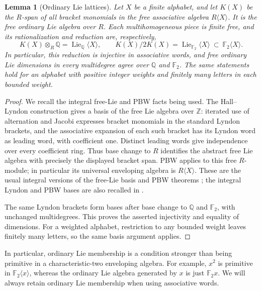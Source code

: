 \documentclass[11pt]{article}
\newcommand{\Q}{\mathbb Q}
\newcommand{\Z}{\mathbb Z}
\newcommand{\F}{{\mathbb F_2}}
\newcommand{\Lie}{\operatorname{Lie}}
\newtheorem{lemma}[theorem]{Lemma}
\theoremstyle{definition}
\theoremstyle{remark}
\numberwithin{equation}{section}
\begin{document}
\begin{samepage}
\begin{lemma}[Ordinary Lie lattices]\label{lem:lie-lattice}
Let \(X\) be a finite alphabet, and let \(K(X)\) be the \(R\)-span of
all bracket monomials in the free associative algebra
\(R\langle X\rangle\).  It is the free ordinary Lie algebra over \(R\).
Each multihomogeneous piece is finite free, and its rationalization and
reduction are, respectively,
\[
 K(X)\otimes_R\Q=\Lie_{\Q}\langle X\rangle,
 \qquad
 K(X)/2K(X)=\Lie_{\F}\langle X\rangle
       \ \subset\ \F\langle X\rangle.
\]
In particular, this reduction is injective in associative words, and
free ordinary Lie dimensions in every multidegree agree over \(\Q\)
and \(\F\).  The same statements hold for an alphabet with positive
integer weights and finitely many letters in each bounded weight.
\end{lemma}
\end{samepage}
\begin{proof}
We recall the integral free-Lie and PBW facts being used.  The
Hall--Lyndon construction gives a basis of the free Lie algebra over
\(\Z\): iterated use of alternation and Jacobi expresses bracket
monomials in the standard Lyndon brackets, and the associative
expansion of each such bracket has its Lyndon word as leading word,
with coefficient one.  Distinct leading words give independence over
every coefficient ring.  Thus base change to \(R\) identifies the
abstract free Lie algebra with precisely the displayed bracket span.
PBW applies to this free \(R\)-module; in particular its universal
enveloping algebra is \(R\langle X\rangle\).  These are the usual
integral versions of the free-Lie basis and PBW theorems
\cite[Theorems~0.2, 0.5, 4.9 and~5.1]{Reutenauer};
the integral Lyndon and PBW bases are also recalled in
\cite[Section~2]{MelanconReutenauer}.

The same Lyndon brackets form bases after base change to $\Q$ and
$\F$, with unchanged multidegrees.  This proves the asserted
injectivity and equality of dimensions.  For a weighted alphabet,
restriction to any bounded weight leaves finitely many letters,
so the same basis argument applies.
\end{proof}

In particular, ordinary Lie membership is a condition stronger than
being primitive in a characteristic-two enveloping algebra.  For
example, \(x^2\) is primitive in \(\F\langle x\rangle\), whereas the
ordinary Lie algebra generated by \(x\) is just \(\F x\).  We will
always retain ordinary Lie membership when using associative words.
\end{document}
